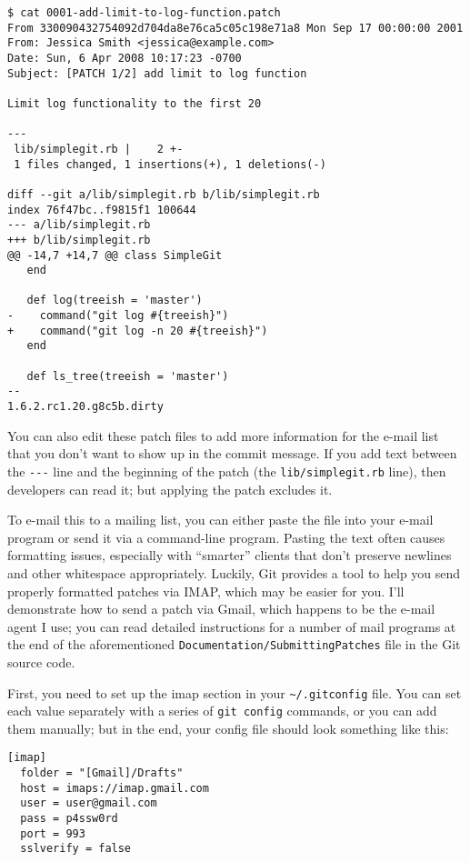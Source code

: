 \documentclass[a4paper]{book}
\begin{document}
\begin{shaded}\begin{verbatim}
$ cat 0001-add-limit-to-log-function.patch
From 330090432754092d704da8e76ca5c05c198e71a8 Mon Sep 17 00:00:00 2001
From: Jessica Smith <jessica@example.com>
Date: Sun, 6 Apr 2008 10:17:23 -0700
Subject: [PATCH 1/2] add limit to log function

Limit log functionality to the first 20

---
 lib/simplegit.rb |    2 +-
 1 files changed, 1 insertions(+), 1 deletions(-)

diff --git a/lib/simplegit.rb b/lib/simplegit.rb
index 76f47bc..f9815f1 100644
--- a/lib/simplegit.rb
+++ b/lib/simplegit.rb
@@ -14,7 +14,7 @@ class SimpleGit
   end

   def log(treeish = 'master')
-    command("git log #{treeish}")
+    command("git log -n 20 #{treeish}")
   end

   def ls_tree(treeish = 'master')
--
1.6.2.rc1.20.g8c5b.dirty
\end{verbatim}\end{shaded}

You can also edit these patch files to add more information for the e-mail list that you don't want to show up in the commit message. If you add text between the \texttt{-{}-{}-} line and the beginning of the patch (the \texttt{lib/simplegit.rb} line), then developers can read it; but applying the patch excludes it.

To e-mail this to a mailing list, you can either paste the file into your e-mail program or send it via a command-line program. Pasting the text often causes formatting issues, especially with “smarter” clients that don't preserve newlines and other whitespace appropriately. Luckily, Git provides a tool to help you send properly formatted patches via IMAP, which may be easier for you. I'll demonstrate how to send a patch via Gmail, which happens to be the e-mail agent I use; you can read detailed instructions for a number of mail programs at the end of the aforementioned \texttt{Documentation/SubmittingPatches} file in the Git source code.

First, you need to set up the imap section in your \texttt{\textasciitilde{}/.gitconfig} file. You can set each value separately with a series of \texttt{git config} commands, or you can add them manually; but in the end, your config file should look something like this:

\begin{shaded}\begin{verbatim}
[imap]
  folder = "[Gmail]/Drafts"
  host = imaps://imap.gmail.com
  user = user@gmail.com
  pass = p4ssw0rd
  port = 993
  sslverify = false
\end{verbatim}\end{shaded}
\end{document}
